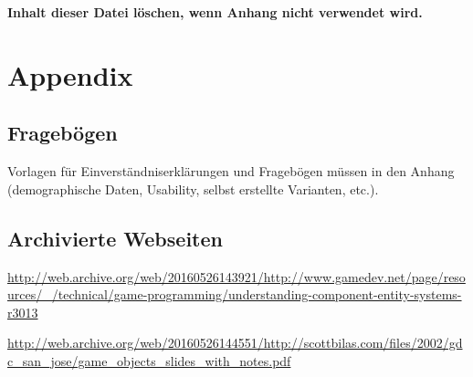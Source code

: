 \appendix

\textbf{\color{red} Inhalt dieser Datei löschen, wenn Anhang nicht verwendet wird.}

\section*{Appendix}
\renewcommand{\thesubsection}{\Alph{subsection}}

\subsection{Fragebögen}

Vorlagen für Einverständniserklärungen und Fragebögen müssen in den Anhang (demographische Daten, Usability, selbst erstellte Varianten, etc.).

\subsection{Archivierte Webseiten}

\url{http://web.archive.org/web/20160526143921/http://www.gamedev.net/page/resources/_/technical/game-programming/understanding-component-entity-systems-r3013}

\url{http://web.archive.org/web/20160526144551/http://scottbilas.com/files/2002/gdc_san_jose/game_objects_slides_with_notes.pdf}


